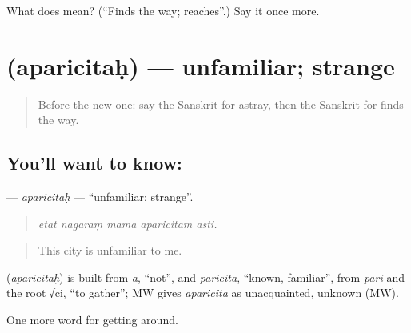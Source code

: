 \begin{tcolorbox}[breakable,colback=teal!4,colframe=teal!35!black,title={Before you move on}]
What does  mean? (\textquotedblleft{}Finds the way; reaches\textquotedblright{}.) Say it once more.
\end{tcolorbox}
\section[\texorpdfstring{\sk{अपरिचितः} (aparicitaḥ)}{अपरिचितः (aparicitaḥ)}]{ (aparicitaḥ) — unfamiliar; strange}

\label{lesson:SA-C414-aparicitah}



\begin{quote}
Before the new one: say the Sanskrit for astray, then the Sanskrit for finds the way.
\end{quote}

\subsection*{You'll want to know: }
\textbf{} — \emph{aparicitaḥ} — \textquotedblleft{}unfamiliar; strange\textquotedblright{}.

\begin{quote}
    
\end{quote}

\begin{quote}
\emph{etat nagaraṃ mama aparicitam asti.}
\end{quote}

\begin{quote}
This city is unfamiliar to me.
\end{quote}

\begin{cousinweb}
\textbf{} (\emph{aparicitaḥ}) is built from \emph{a}, \textquotedblleft{}not\textquotedblright{}, and \emph{paricita}, \textquotedblleft{}known, familiar\textquotedblright{}, from \emph{pari} and the root √ci, \textquotedblleft{}to gather\textquotedblright{}; MW gives \emph{aparicita} as unacquainted, unknown (MW).
\end{cousinweb}

\begin{grammarlens}[title={What you've built}]
One more word for getting around.
\end{grammarlens}

